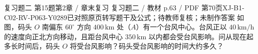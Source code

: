 \par\noindent\begin{minipage}{\linewidth}
\begin{bankitem}{复习题二 第15题}{第2章 / 章末复习 复习题二 / 教材 p.63 / PDF 第70页}{XJ-B1-C02-RV-P063-Y0289}{已对照原页转写题干及公式；待教师复核；未制作答案}
如图，码头 $O$ 南偏东 $60^\circ$ 方向 $400\,\mathrm{km}$ 处（$A$）有一个台风中心。台风正以 $40\,\mathrm{km/h}$ 的速度向正北方向移动，且距台风中心 $350\,\mathrm{km}$ 以内都会受台风影响。问从现在起多长时间后，码头 $O$ 将受台风影响？码头受台风影响的时间大约多久？
\end{bankitem}
\end{minipage}\par\medskip

